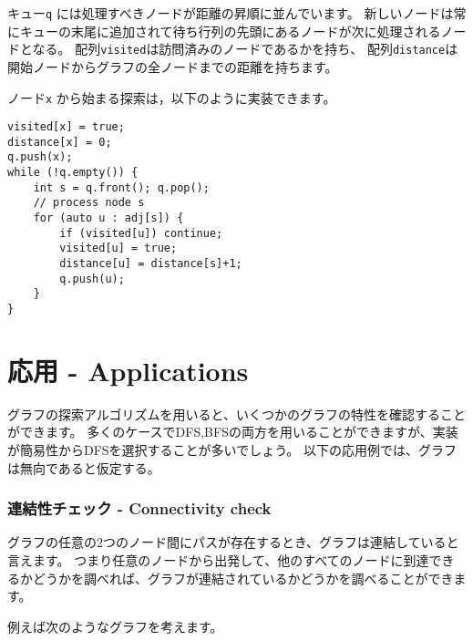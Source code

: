 キュー\texttt{q} には処理すべきノードが距離の昇順に並んでいます。
新しいノードは常にキューの末尾に追加されて待ち行列の先頭にあるノードが次に処理されるノードとなる。
配列\texttt{visited}は訪問済みのノードであるかを持ち、
配列\texttt{distance}は開始ノードからグラフの全ノードまでの距離を持ちます。

ノード\texttt{x} から始まる探索は，以下のように実装できます。
\begin{lstlisting}
visited[x] = true;
distance[x] = 0;
q.push(x);
while (!q.empty()) {
    int s = q.front(); q.pop();
    // process node s
    for (auto u : adj[s]) {
        if (visited[u]) continue;
        visited[u] = true;
        distance[u] = distance[s]+1;
        q.push(u);
    }
}
\end{lstlisting}


\section{応用 - Applications}


グラフの探索アルゴリズムを用いると、いくつかのグラフの特性を確認することができます。
多くのケースでDFS,BFSの両方を用いることができますが、実装が簡易性からDFSを選択することが多いでしょう。
以下の応用例では、グラフは無向であると仮定する。

\subsubsection{連結性チェック - Connectivity check}


グラフの任意の2つのノード間にパスが存在するとき、グラフは連結していると言えます。
つまり任意のノードから出発して、他のすべてのノードに到達できるかどうかを調べれば、グラフが連結されているかどうかを調べることができます。

例えば次のようなグラフを考えます。
\begin{center}
\end{center}


